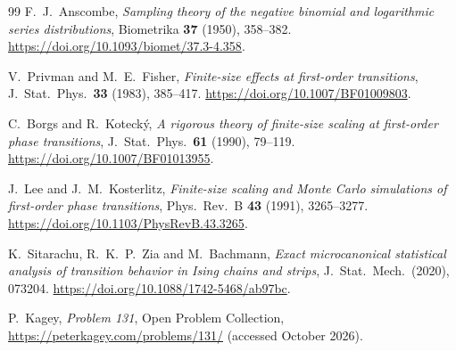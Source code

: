 \documentclass[11pt]{article}
\theoremstyle{definition}
\theoremstyle{remark}
\begin{document}
\begin{thebibliography}{99}
F.~J.~Anscombe, \emph{Sampling theory of the negative binomial and
logarithmic series distributions}, Biometrika \textbf{37} (1950), 358--382.
\url{https://doi.org/10.1093/biomet/37.3-4.358}.

V.~Privman and M.~E.~Fisher, \emph{Finite-size effects at first-order
transitions}, J.~Stat.~Phys.\ \textbf{33} (1983), 385--417.
\url{https://doi.org/10.1007/BF01009803}.

C.~Borgs and R.~Koteck\'y, \emph{A rigorous theory of finite-size scaling at
first-order phase transitions}, J.~Stat.~Phys.\ \textbf{61} (1990), 79--119.
\url{https://doi.org/10.1007/BF01013955}.

J.~Lee and J.~M.~Kosterlitz, \emph{Finite-size scaling and Monte Carlo
simulations of first-order phase transitions}, Phys.~Rev.~B \textbf{43}
(1991), 3265--3277.
\url{https://doi.org/10.1103/PhysRevB.43.3265}.

K.~Sitarachu, R.~K.~P.~Zia and M.~Bachmann, \emph{Exact microcanonical
statistical analysis of transition behavior in Ising chains and strips},
J.~Stat.~Mech.\ (2020), 073204.
\url{https://doi.org/10.1088/1742-5468/ab97bc}.

P.~Kagey, \emph{Problem 131}, Open Problem Collection,
\url{https://peterkagey.com/problems/131/} (accessed October 2026).

\end{thebibliography}
\end{document}
